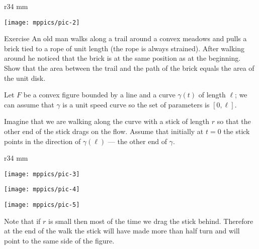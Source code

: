 {

\begin{wrapfigure}{r}{34 mm}

\vskip-4mm

\centering

\texttt{[image: mppics/pic-2]}


\end{wrapfigure}



\begin{thm}{Exercise}
An old man walks along a trail around a convex meadows and pulls a brick tied to a rope of unit length (the rope is always strained).
After walking around he noticed that the brick is at the same position as at the beginning.
Show that the area between the trail and the path of the brick equals the area of the unit disk. 
\end{thm}



}



Let $F$ be a convex figure bounded by a line and a curve $\gamma(t)$ of length $\ell$;
we can assume that $\gamma$ is a unit speed curve so the set of parameters is $[0,\ell]$.



Imagine that we are walking along the curve with a stick of length $r$ so that the other end of the stick drags on the flow.
Assume that initially at $t=0$ the stick points in the direction of $\gamma(\ell)$ --- the other end of $\gamma$.



\begin{wrapfigure}{r}{34 mm}

\vskip-0mm

\centering

\texttt{[image: mppics/pic-3]}


\bigskip

\texttt{[image: mppics/pic-4]}


\bigskip

\texttt{[image: mppics/pic-5]}

\end{wrapfigure}



Note that if $r$ is small then most of the time we drag the stick behind. Therefore at the end of the walk the stick will have made more than half turn and will point to the same side of the figure.



